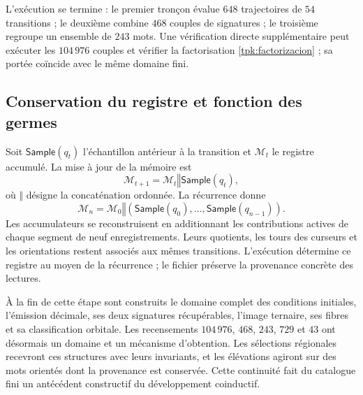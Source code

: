 L'exécution se termine : le premier tronçon évalue \(648\) trajectoires de \(54\) transitions ; le deuxième combine \(468\) couples de signatures ; le troisième regroupe un ensemble de \(243\) mots. Une vérification directe supplémentaire peut exécuter les \(104\,976\) couples et vérifier la factorisation \eqref{tpk:factorizacion} ; sa portée coïncide avec le même domaine fini.

\subsection{Conservation du registre et fonction des germes}
\label{tpk:conclusion}

Soit \(\mathsf{Sample}(q_t)\) l'échantillon antérieur à la transition et \(\mathcal M_t\) le registre accumulé. La mise à jour de la mémoire est
\begin{equation}
 \mathcal M_{t+1}=\mathcal M_t\mathbin{\Vert}\mathsf{Sample}(q_t),
 \label{tpk:archivo}
\end{equation}
où \(\Vert\) désigne la concaténation ordonnée. La récurrence donne
\[
 \mathcal M_n=\mathcal M_0\mathbin{\Vert}
 (\mathsf{Sample}(q_0),\ldots,\mathsf{Sample}(q_{n-1})).
\]
Les accumulateurs se reconstruisent en additionnant les contributions actives de
chaque segment de neuf enregistrements. Leurs quotients, les tours des
curseurs et les orientations restent associés aux mêmes transitions.
L'exécution détermine ce registre au moyen de la récurrence ; le fichier
préserve la provenance concrète des lectures.

À la fin de cette étape sont construits le domaine complet des conditions
initiales, l'émission décimale, ses deux signatures récupérables, l'image ternaire,
ses fibres et sa classification orbitale. Les recensements \(104\,976\), \(468\),
\(243\), \(729\) et \(43\) ont désormais un domaine et un mécanisme d'obtention.
Les sélections régionales recevront ces structures avec leurs invariants,
et les élévations agiront sur des mots orientés dont la provenance est
conservée. Cette continuité fait du catalogue fini un antécédent
constructif du développement coinductif.
